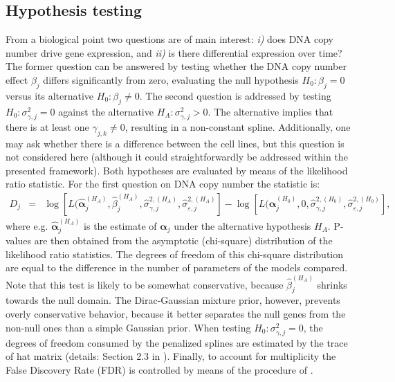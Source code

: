 \subsection{Hypothesis testing}
\label{testing}
From a biological point two questions are of main interest: \textit{ i)} does DNA copy number drive gene expression, and \textit{ii)} is there differential expression over time? The former question can be answered by testing whether the DNA copy number effect $\beta_j$ differs significantly from zero, evaluating the null hypothesis $H_0 : \beta_j = 0$ versus its alternative $H_0 : \beta_j \not= 0$. The second question is addressed by testing $H_0: \sigma_{\gamma,j}^2=0$ against the alternative $H_A: \sigma_{\gamma,j}^2 > 0$. The alternative implies that there is at least one $\gamma_{j,k} \not= 0$, resulting in a non-constant spline. Additionally, one may ask whether there is a difference between the cell lines, but this question is not considered here (although it could straightforwardly be addressed within the presented framework).
Both hypotheses are evaluated by means of the likelihood ratio statistic. For the first question on DNA copy number the statistic is:
\begin{eqnarray*}
D_j & = &  \log [ L(\hat{\boldsymbol{\alpha}}_j^{(H_A)}, \hat{\beta}_j^{(H_A)}, \hat{\sigma}_{\gamma,j}^{2, (H_A)}, \hat{\sigma}_{\varepsilon, j}^{2, (H_A)} ]
- \log [ L(\hat{\boldsymbol{\alpha}}_j^{(H_0)}, 0, \hat{\sigma}_{\gamma,j}^{2, (H_0)}, \hat{\sigma}_{\varepsilon, j}^{2, (H_0)} ],
\end{eqnarray*}
where e.g. $\hat{\boldsymbol{\alpha}}_j^{(H_A)}$ is the estimate of $\boldsymbol{\alpha}_j$ under the alternative hypothesis $H_A$. P-values are then obtained from the asymptotic (chi-square) distribution of the likelihood ratio statistics. The degrees of freedom of this chi-square distribution are equal to the difference in the number of parameters of the models compared. Note that this test is likely to be somewhat conservative, because $\hat{\beta}_j^{(H_A)}$ shrinks towards the null domain. The Dirac-Gaussian mixture prior, however, prevents overly conservative behavior, because it better separates the null genes from the non-null ones than a simple Gaussian prior. When testing $H_0: \sigma_{\gamma,j}^2=0$, the degrees of freedom consumed by the penalized splines are estimated by the trace of hat matrix (details: Section 2.3 in \cite{Supp2018}). Finally, to account for multiplicity the False Discovery Rate (FDR) is controlled by means of the procedure of \cite{Benjamini1995}.
\\
